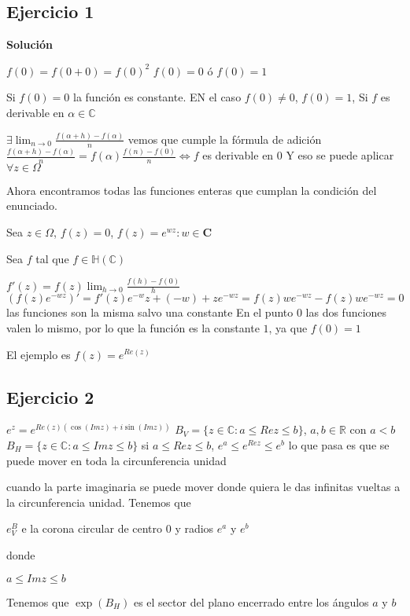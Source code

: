 \subsection{Ejercicio 1}


\textbf{Solución}

$f(0) = f(0+0) = f(0)^2$
$f(0)= 0$ ó $f(0) = 1$

Si $f(0)=0$ la función es constante.
EN el caso $f(0)\not =0$, $f(0)=1$, 
Si $f$ es derivable en $\alpha\in\mathbb{C}$

$\exists \lim_{n\rightarrow 0} \frac{f(\alpha+h)-f(\alpha)}{n}$
vemos que cumple la fórmula de adición 
$\frac{f(\alpha+h)-f(\alpha)}{n} = f(\alpha) \frac{f(n)-f(0)}{n} \Longleftrightarrow f$ es derivable en $0$
Y eso se puede aplicar $\forall z\in\Omega$

Ahora encontramos todas las funciones enteras que cumplan la condición del enunciado.

Sea $z\in\Omega$, $f(z)=0$, $f(z) = e^{wz} : w\in\mathbf{C}$

Sea $f$ tal que $f\in\mathbb{H}(\mathbb{C})$

$ f'(z) = f(z) \lim_{h\rightarrow 0} \frac{f(h)-f(0)}{h}$
$(f(z) e^{-wz})' = f'(z) e^{-w}z + (-w) +ze^{-wz} = f(z)we^{-wz} - f(z)we^{-wz} = 0$
las funciones son la misma salvo una constante
En el punto $0$ las dos funciones valen lo mismo, por lo que la función es la constante $1$, ya que $f(0)=1$


El ejemplo es $f(z) = e^{Re(z)}$


\subsection{Ejercicio 2}

$e^z = e^{Re(z) (\cos(Imz) + i\sin(Imz))}$
$B_V = \{ z\in\mathbb{C} : a\leq Rez \leq b \}$, $a,b\in\mathbb{R}$ con $a<b$
$B_H = \{ z\in\mathbb{C} : a\leq Imz \leq b \}$
si $a\leq Rez \leq b$, $e^a \leq e^{Rez} \leq e^b$
lo que pasa es que se puede mover en toda la circunferencia unidad

cuando la parte imaginaria se puede mover donde quiera le das infinitas vueltas a la circunferencia unidad. Tenemos que

$e^B_V$ e la corona circular de centro $0$ y radios $e^a$ y $e^b$

donde

$a\leq Imz \leq b$

Tenemos que $\exp(B_H)$ es el sector del plano encerrado entre los ángulos $a$ y $b$




